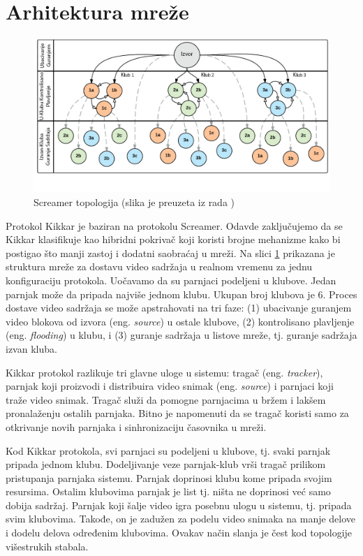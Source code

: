 \documentclass[12pt,oneside]{memoir}
\begin{document}
\section{Arhitektura mreže}
\label{Kikkar.1}

\begin{figure}[!ht]
  \centering
  \includegraphics[width=1.05\textwidth]{slike/screamer-topology.jpg}
  \caption{Screamer topologija (slika je preuzeta iz rada \cite{ClubbingWithThePeers})}
  \label{fig:screamer-topologija}
\end{figure}
\par

Protokol Kikkar je baziran na protokolu Screamer. Odavde zaključujemo da se Kikkar klasifikuje kao hibridni pokrivač koji koristi brojne mehanizme kako bi postigao što manji zastoj i dodatni saobraćaj u mreži. Na slici \ref{fig:screamer-topologija} prikazana je struktura mreže za dostavu video sadržaja u realnom vremenu za jednu konfiguraciju protokola. Uočavamo da su parnjaci podeljeni u klubove. Jedan parnjak može da pripada najviše jednom klubu. Ukupan broj klubova je 6. Proces dostave video sadržaja se može apstrahovati na tri faze: (1) ubacivanje guranjem video blokova od izvora (eng. \textit{source}) u ostale klubove, (2) kontrolisano plavljenje (eng. \textit{flooding}) u klubu, i (3) guranje sadržaja u listove mreže, tj. guranje sadržaja izvan kluba.

Kikkar protokol razlikuje tri glavne uloge u sistemu: tragač (eng. \textit{tracker}), parnjak koji proizvodi i distribuira video snimak (eng. \textit{source}) i parnjaci koji traže video snimak. Tragač služi da pomogne parnjacima u bržem i lakšem pronalaženju ostalih parnjaka. Bitno je napomenuti da se tragač koristi samo za otkrivanje novih parnjaka i sinhronizaciju časovnika u mreži. 

Kod Kikkar protokola, svi parnjaci su podeljeni u klubove, tj. svaki parnjak pripada jednom klubu. Dodeljivanje veze parnjak-klub vrši tragač prilikom pristupanja parnjaka sistemu. Parnjak doprinosi klubu kome pripada svojim resursima. Ostalim klubovima parnjak je list tj. ništa ne doprinosi već samo dobija sadržaj. Parnjak koji šalje video igra posebnu ulogu u sistemu, tj. pripada svim klubovima. Takođe, on je zadužen za podelu video snimaka na manje delove i dodelu delova određenim klubovima. Ovakav način slanja je čest kod topologije višestrukih stabala.
\end{document}
